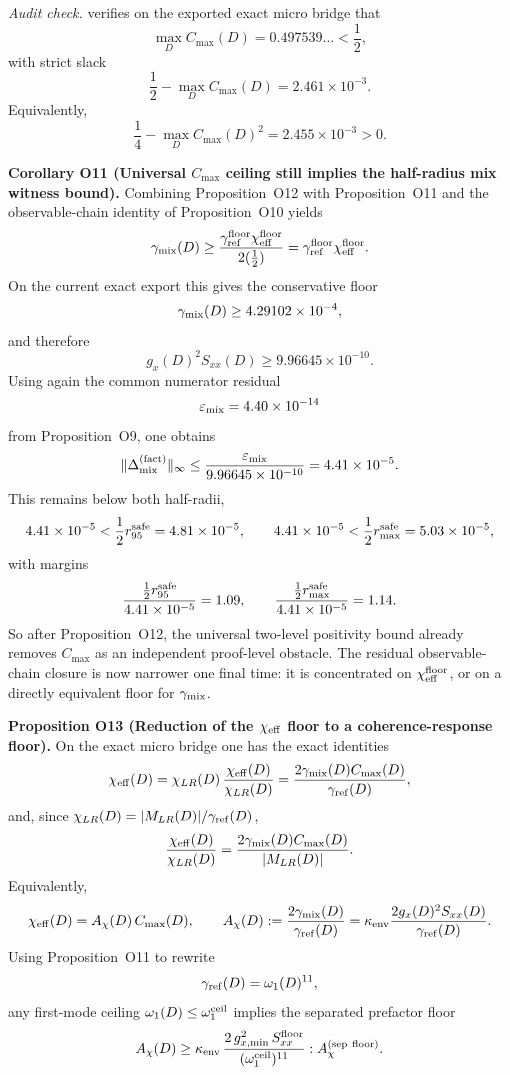 \documentclass[aps,prd,onecolumn,notitlepage,nofootinbib,superscriptaddress,11pt,floatfix]{revtex4-2}
\begin{document}
\textit{Audit check.}  verifies on the exported exact micro bridge that
\[
\max_D C_{\max}(D)=0.497539\ldots<\frac12,
\]
with strict slack
\[
\frac12-\max_D C_{\max}(D)=2.461\times10^{-3}.
\]
Equivalently,
\[
\frac14-\max_D C_{\max}(D)^2=2.455\times10^{-3}>0.
\]

\medskip\noindent\textbf{Corollary O11 (Universal \texorpdfstring{$C_{\max}$}{Cmax} ceiling still implies the half-radius mix witness bound).}
Combining Proposition~O12 with Proposition~O11 and the observable-chain identity of Proposition~O10 yields
\[
\gamma_{\rm mix}(D)\ge
\frac{\gamma_{\rm ref}^{\rm floor}\chi_{\rm eff}^{\rm floor}}{2(\tfrac12)}
=
\gamma_{\rm ref}^{\rm floor}\chi_{\rm eff}^{\rm floor}.
\]
On the current exact export this gives the conservative floor
\[
\gamma_{\rm mix}(D)\ge 4.29102\times10^{-4},
\]
and therefore
\[
g_x(D)^2S_{xx}(D)\ge 9.96645\times10^{-10}.
\]
Using again the common numerator residual
\[
\varepsilon_{\rm mix}=4.40\times10^{-14}
\]
from Proposition~O9, one obtains
\[
\|\Delta_{\rm mix}^{\rm(fact)}\|_\infty
\le
\frac{\varepsilon_{\rm mix}}{9.96645\times10^{-10}}
=4.41\times10^{-5}.
\]
This remains below both half-radii,
\[
4.41\times10^{-5}<\frac12 r_{95}^{\rm safe}=4.81\times10^{-5},
\qquad
4.41\times10^{-5}<\frac12 r_{\max}^{\rm safe}=5.03\times10^{-5},
\]
with margins
\[
\frac{\tfrac12 r_{95}^{\rm safe}}{4.41\times10^{-5}}=1.09,
\qquad
\frac{\tfrac12 r_{\max}^{\rm safe}}{4.41\times10^{-5}}=1.14.
\]
So after Proposition~O12, the universal two-level positivity bound already removes $C_{\max}$ as an independent proof-level obstacle. The residual observable-chain closure is now narrower one final time: it is concentrated on $\chi_{\rm eff}^{\rm floor}$, or on a directly equivalent floor for $\gamma_{\rm mix}$.

\medskip\noindent\textbf{Proposition O13 (Reduction of the \texorpdfstring{$\chi_{\rm eff}$}{chi_eff} floor to a coherence-response floor).}
On the exact micro bridge one has the exact identities
\[
\chi_{\rm eff}(D)
=
\chi_{LR}(D)\,\frac{\chi_{\rm eff}(D)}{\chi_{LR}(D)}
=
\frac{2\gamma_{\rm mix}(D)C_{\max}(D)}{\gamma_{\rm ref}(D)},
\]
and, since $\chi_{LR}(D)=|M_{LR}(D)|/\gamma_{\rm ref}(D)$,
\[
\frac{\chi_{\rm eff}(D)}{\chi_{LR}(D)}
=
\frac{2\gamma_{\rm mix}(D)C_{\max}(D)}{|M_{LR}(D)|}.
\]
Equivalently,
\[
\chi_{\rm eff}(D)=A_\chi(D)\,C_{\max}(D),
\qquad
A_\chi(D):=\frac{2\gamma_{\rm mix}(D)}{\gamma_{\rm ref}(D)}
=
\kappa_{\rm env}\frac{2g_x(D)^2S_{xx}(D)}{\gamma_{\rm ref}(D)}.
\]
Using Proposition~O11 to rewrite
\[
\gamma_{\rm ref}(D)=\omega_1(D)^{11},
\]
any first-mode ceiling $\omega_1(D)\le \omega_1^{\rm ceil}$ implies the separated prefactor floor
\[
A_\chi(D)\ge
\kappa_{\rm env}\,
\frac{2\,g_{x,\min}^2\,S_{xx}^{\rm floor}}{(\omega_1^{\rm ceil})^{11}}
:
A_\chi^{\rm(sep\ floor)}.
\]
\end{document}

